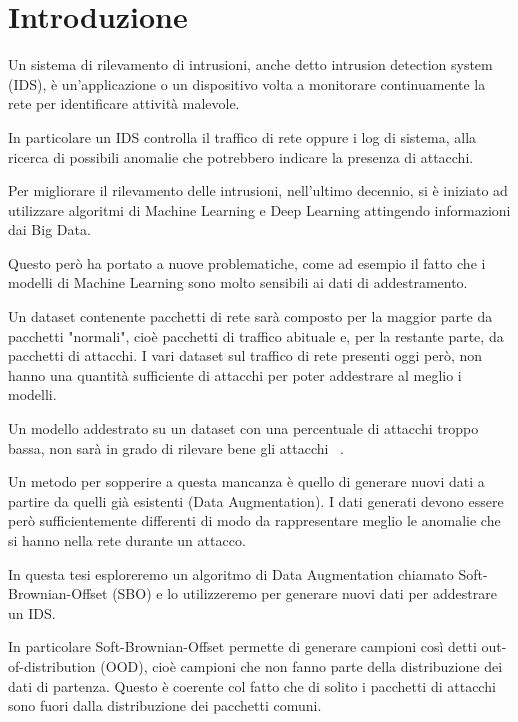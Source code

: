 \chapter{Introduzione}

Un sistema di rilevamento di intrusioni, anche detto intrusion detection system (IDS),  è un'applicazione o un dispositivo volta a monitorare continuamente la rete per identificare attività malevole. 

In particolare un IDS controlla il traffico di rete oppure i log di sistema, alla ricerca di possibili anomalie che potrebbero indicare la presenza di attacchi.

Per migliorare il rilevamento delle intrusioni, nell'ultimo decennio, si è iniziato ad utilizzare algoritmi di Machine Learning e Deep Learning attingendo informazioni dai Big Data. \cite{NetworkIntrusionDetection2021}

Questo però ha portato a nuove problematiche, come ad esempio il fatto che i modelli di Machine Learning sono molto sensibili ai dati di addestramento.


Un dataset contenente pacchetti di rete sarà composto per la maggior parte da pacchetti "normali", cioè pacchetti di traffico abituale e, per la restante parte, da pacchetti di attacchi. 
I vari dataset sul traffico di rete presenti oggi però, non hanno una quantità sufficiente di attacchi per poter addestrare al meglio i modelli. 

Un modello addestrato su un dataset con una percentuale di attacchi troppo bassa, non sarà in grado di rilevare bene gli attacchi ~\cite{gopalanBalancingApproachesML2021}.

Un metodo per sopperire a questa mancanza è quello di generare nuovi dati a partire da quelli già esistenti (Data Augmentation). I dati generati devono essere però sufficientemente differenti di modo da rappresentare meglio le anomalie che si hanno nella rete durante un attacco.


In questa tesi esploreremo un algoritmo di Data Augmentation chiamato Soft-Brownian-Offset (SBO) \cite{sbo} e lo utilizzeremo per generare nuovi dati per addestrare un IDS.

In particolare Soft-Brownian-Offset permette di generare campioni così detti out-of-distribution (OOD), cioè campioni che non fanno parte della distribuzione dei dati di partenza. Questo è coerente col fatto che di solito i pacchetti di attacchi sono fuori dalla distribuzione dei pacchetti comuni.


